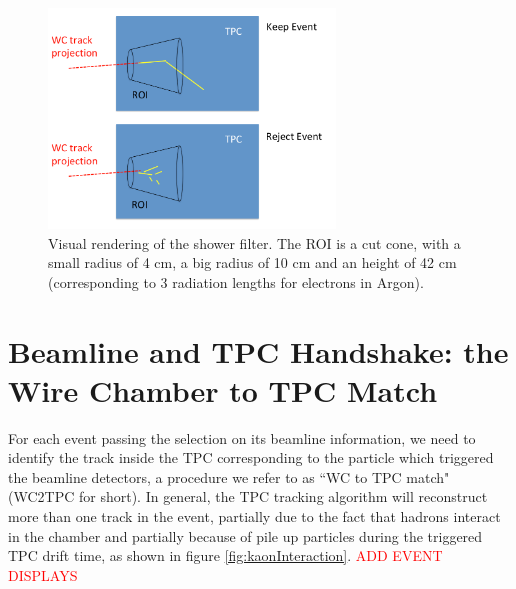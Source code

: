 \begin{figure}
  \centering  
\includegraphics[width=3in]{Chapter-4/Images/Shower.png}
\caption{Visual rendering of the shower filter. The ROI is a cut cone, with a small radius of 4 cm, a big radius of 10 cm and an height of 42 cm (corresponding to 3 radiation lengths for electrons in Argon).}
\label{fig:showerFilt}
\end{figure}



\section{Beamline and TPC Handshake: the Wire Chamber to TPC Match}\label{ch:WC2TPCMatchMethod}
For each event passing the selection on its beamline information, we need to identify the track inside the TPC corresponding to the particle which triggered the beamline detectors, a procedure we refer to as ``WC to TPC match" (WC2TPC for short). In general, the TPC tracking algorithm will reconstruct more than one track in the event, partially due to the fact that hadrons interact in the chamber and partially because of pile up particles during the triggered TPC drift time, as shown in figure \ref{fig:kaonInteraction}. 
\textcolor{red}{ADD EVENT DISPLAYS}


